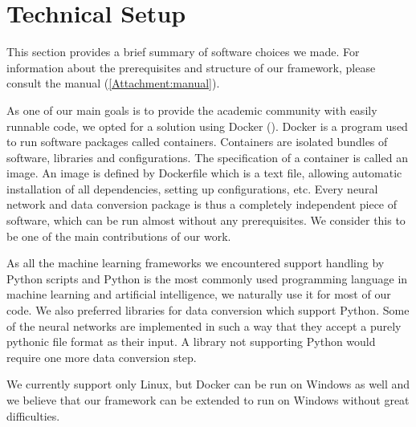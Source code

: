 \section{Technical Setup}
This section provides a brief summary of software choices we made. For information about the prerequisites and structure of our framework, please consult the manual (\autoref{Attachment:manual}). \par
As one of our main goals is to provide the academic community with easily runnable code, we opted for a solution using Docker (\cite{merkel_docker:_2014}). Docker is a program used to run software packages called containers. Containers are isolated bundles of software, libraries and configurations. The specification of a container is called an image. An image is defined by Dockerfile which is a text file, allowing automatic installation of all dependencies, setting up configurations, etc. Every neural network and data conversion package is thus a completely independent piece of software, which can be run almost without any prerequisites. We consider this to be one of the main contributions of our work. \par
As all the machine learning frameworks we encountered support handling by Python scripts and Python is the most commonly used programming language in machine learning and artificial intelligence, we naturally use it for most of our code. We also preferred libraries for data conversion which support Python. Some of the neural networks are implemented in such a way that they accept a purely pythonic file format as their input. A library not supporting Python would require one more data conversion step.\par
We currently support only Linux, but Docker can be run on Windows as well and we believe that our framework can be extended to run on Windows without great difficulties. 
